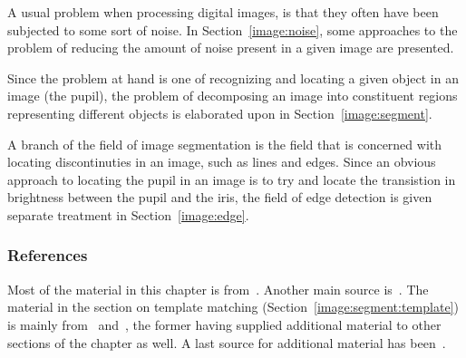 A usual problem when processing digital images, is that they often
have been subjected to some sort of noise.  In
Section~\ref{image:noise}, some approaches to the problem of reducing
the amount of noise present in a given image are presented.  

Since the problem at hand is one of recognizing and locating a given
object in an image (the pupil), the problem of decomposing an image
into constituent regions representing different objects is elaborated
upon in Section~\ref{image:segment}.  

A branch of the field of image segmentation is the field that is
concerned with locating discontinuties in an image, such as lines and
edges.  Since an obvious approach to locating the pupil in an image is
to try and locate the transistion in brightness between the pupil and
the iris, the field of edge detection is given separate treatment in
Section~\ref{image:edge}.  

\subsubsection{References}

Most of the material in this chapter is from~\cite{digim}.  Another
main source is~\cite{digpic}.  The material in the section on template
matching (Section~\ref{image:segment:template}) is mainly
from~\cite{digpat} and~\cite{template}, the former having supplied
additional material to other sections of the chapter as well.  A last
source for additional material has been~\cite{digbild}.
